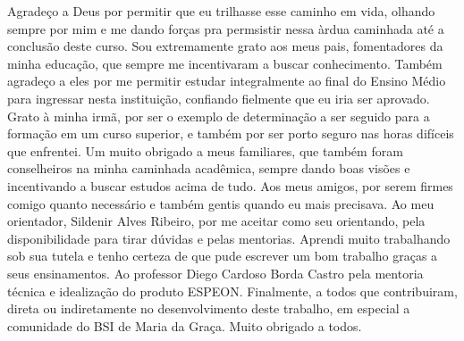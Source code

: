 Agradeço a Deus por permitir que eu trilhasse esse caminho em vida, olhando sempre por mim e me dando forças pra permsistir nessa àrdua caminhada até a conclusão deste curso.
Sou extremamente grato aos meus pais, fomentadores da minha educação, que sempre me incentivaram a buscar conhecimento. Também agradeço a eles por me permitir estudar integralmente ao final do Ensino Médio para ingressar nesta instituição, confiando fielmente que eu iria ser aprovado.
Grato à minha irmã, por ser o exemplo de determinação a ser seguido para a formação em um curso superior, e também por ser porto seguro nas horas difíceis que enfrentei.
Um muito obrigado a meus familiares, que também foram conselheiros na minha caminhada acadêmica, sempre dando boas visões e incentivando a buscar estudos acima de tudo.
Aos meus amigos, por serem firmes comigo quanto necessário e também gentis quando eu mais precisava.
Ao meu orientador, Sildenir Alves Ribeiro, por me aceitar como seu orientando, pela disponibilidade para tirar dúvidas e pelas mentorias. Aprendi muito trabalhando sob sua tutela e tenho certeza de que pude escrever um bom trabalho graças a seus ensinamentos.
Ao professor Diego Cardoso Borda Castro pela mentoria técnica e idealização do produto ESPEON.
Finalmente, a todos que contribuiram, direta ou indiretamente no desenvolvimento deste trabalho, em especial a comunidade do BSI de Maria da Graça. Muito obrigado a todos.